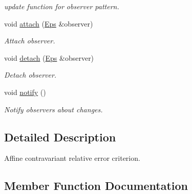 \begin{DoxyCompactItemize}
\begin{DoxyCompactList}\small\item\em update function for observer pattern. \end{DoxyCompactList}\item 
void \hyperlink{classSpacy_1_1Mixin_1_1MixinConnection_abb5520ee6b22dd993d78f142939a1ed4}{attach} (\hyperlink{classSpacy_1_1Mixin_1_1Eps_a51dbe0b9cc950e0f3dfd34a481f08ae4}{Eps} \&observer)\hypertarget{classSpacy_1_1Mixin_1_1MixinConnection_abb5520ee6b22dd993d78f142939a1ed4}{}\label{classSpacy_1_1Mixin_1_1MixinConnection_abb5520ee6b22dd993d78f142939a1ed4}

\begin{DoxyCompactList}\small\item\em Attach observer. \end{DoxyCompactList}\item 
void \hyperlink{classSpacy_1_1Mixin_1_1MixinConnection_adda739590c487679c26f60e50aedb73f}{detach} (\hyperlink{classSpacy_1_1Mixin_1_1Eps_a51dbe0b9cc950e0f3dfd34a481f08ae4}{Eps} \&observer)\hypertarget{classSpacy_1_1Mixin_1_1MixinConnection_adda739590c487679c26f60e50aedb73f}{}\label{classSpacy_1_1Mixin_1_1MixinConnection_adda739590c487679c26f60e50aedb73f}

\begin{DoxyCompactList}\small\item\em Detach observer. \end{DoxyCompactList}\item 
void \hyperlink{classSpacy_1_1Mixin_1_1MixinConnection_a1ddeaa78a3bb4a38c2cca36d1f99fe36}{notify} ()\hypertarget{classSpacy_1_1Mixin_1_1MixinConnection_a1ddeaa78a3bb4a38c2cca36d1f99fe36}{}\label{classSpacy_1_1Mixin_1_1MixinConnection_a1ddeaa78a3bb4a38c2cca36d1f99fe36}

\begin{DoxyCompactList}\small\item\em Notify observers about changes. \end{DoxyCompactList}\end{DoxyCompactItemize}


\subsection{Detailed Description}
Affine contravariant relative error criterion. 

\subsection{Member Function Documentation}
